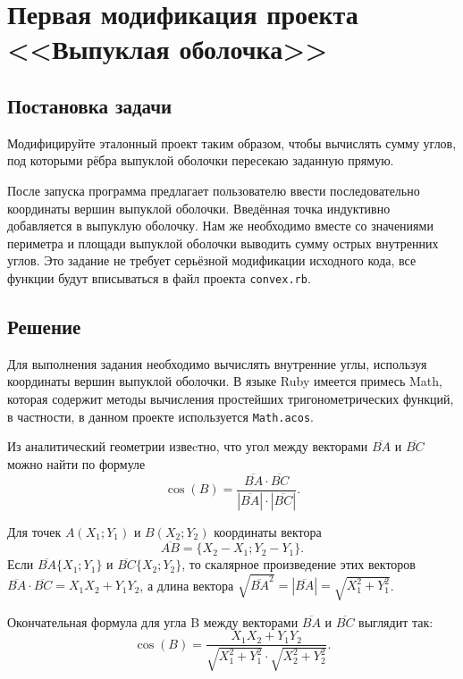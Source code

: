 \section{Первая модификация проекта <<Выпуклая оболочка>>}

\subsection{Постановка задачи}

Модифицируйте эталонный проект таким образом, чтобы вычислять сумму углов, под которыми рёбра выпуклой оболочки пересекаю заданную прямую.

После запуска программа предлагает пользователю ввести последовательно координаты вершин выпуклой оболочки. Введённая точка индуктивно добавляется в выпуклую оболочку. Нам же необходимо вместе со значениями периметра и площади выпуклой оболочки выводить сумму острых внутренних углов.
Это задание не требует серьёзной модификации исходного кода, все функции будут вписываться в файл проекта \verb|convex.rb|.

\subsection{Решение}

Для выполнения задания необходимо вычислять внутренние углы, используя координаты вершин выпуклой оболочки. В языке Ruby имеется примесь Math, которая содержит методы вычисления простейших тригонометрических функций, в частности, в данном проекте используется \verb|Math.acos|.

Из аналитический геометрии извеcтно, что угол между векторами $\overline{BA}$ и $\overline{BC}$ можно найти по формуле 
$$\cos(B) =\dfrac{\overline{BA}\cdot \overline{BC}}{|\overline{BA}|\cdot|\overline{BC}|}.$$

Для точек $A(X_1;Y_1)$ и $B(X_2;Y_2)$ координаты вектора \begin{equation}\overline{AB}=\{X_2-X_1;Y_2-Y_1\}.\label{1}\end{equation}
Если $\overline{BA}\{X_1;Y_1\}$ и $\overline{BC}\{X_2;Y_2\}$, то скалярное произведение этих векторов $\overline{BA}\cdot \overline{BC}=X_1X_2+Y_1Y_2$, а длина вектора $\sqrt{\overline{BA}^2}=|\overline{BA}|=\sqrt{X_1^2+Y_1^2}$.

Окончательная формула для угла B между векторами $\overline{BA}$ и $\overline{BC}$ выглядит так:
\begin{equation}\cos(B) =\dfrac{X_1X_2+Y_1Y_2}{\sqrt{X_1^2+Y_1^2}\cdot\sqrt{X_2^2+Y_2^2}}.\label{2}\end{equation}

